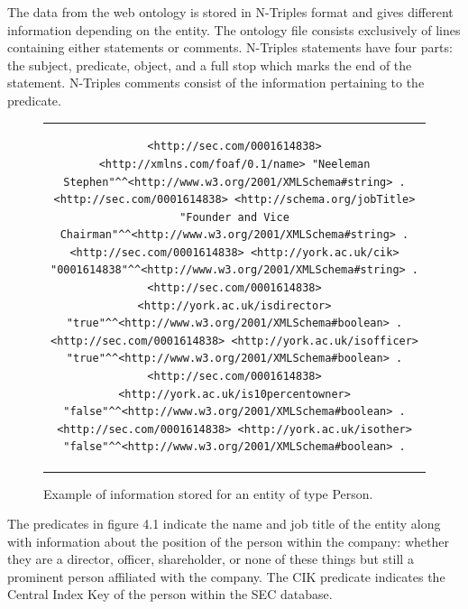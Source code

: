 \documentclass{UoYCSproject}
\begin{document}
The data from the web ontology is stored in N-Triples format and gives different information depending on the entity. The ontology file consists exclusively of lines containing either statements or comments. N-Triples statements have four parts: the subject, predicate, object, and a full stop which marks the end of the statement. N-Triples comments consist of the information pertaining to the predicate.\newpage

\begin{figure}[t]
\begin{center}
\begin{tabular}{c}
\begin{lstlisting}[breaklines, basicstyle=\small, columns=fullflexible]
<http://sec.com/0001614838> <http://xmlns.com/foaf/0.1/name> "Neeleman Stephen"^^<http://www.w3.org/2001/XMLSchema#string> .
<http://sec.com/0001614838> <http://schema.org/jobTitle> "Founder and Vice Chairman"^^<http://www.w3.org/2001/XMLSchema#string> .
<http://sec.com/0001614838> <http://york.ac.uk/cik> "0001614838"^^<http://www.w3.org/2001/XMLSchema#string> .
<http://sec.com/0001614838> <http://york.ac.uk/isdirector> "true"^^<http://www.w3.org/2001/XMLSchema#boolean> .
<http://sec.com/0001614838> <http://york.ac.uk/isofficer> "true"^^<http://www.w3.org/2001/XMLSchema#boolean> .
<http://sec.com/0001614838> <http://york.ac.uk/is10percentowner> "false"^^<http://www.w3.org/2001/XMLSchema#boolean> .
<http://sec.com/0001614838> <http://york.ac.uk/isother> "false"^^<http://www.w3.org/2001/XMLSchema#boolean> .
\end{lstlisting}
\end{tabular}
\end{center}
\caption{Example of information stored for an entity of type Person.}
\end{figure}

The predicates in figure 4.1 indicate the name and job title of the entity along with information about the position of the person within the company: whether they are a director, officer, shareholder, or none of these things but still a prominent person affiliated with the company. The CIK predicate indicates the Central Index Key of the person within the SEC database.
\end{document}
